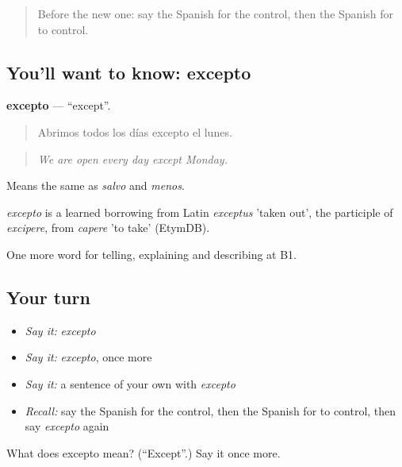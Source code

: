 \label{lesson:ES-C638-excepto}



\begin{quote}
Before the new one: say the Spanish for the control, then the Spanish for to control.
\end{quote}

\subsection*{You'll want to know: excepto}
\textbf{excepto} — \textquotedblleft{}except\textquotedblright{}.

\begin{quote}
Abrimos todos los días excepto el lunes.
\end{quote}

\begin{quote}
\emph{We are open every day except Monday.}
\end{quote}

Means the same as \emph{salvo} and \emph{menos}.

\begin{cousinweb}
\emph{excepto} is a learned borrowing from Latin \emph{exceptus} 'taken out', the participle of \emph{excipere}, from \emph{capere} 'to take' (EtymDB).
\end{cousinweb}

\begin{grammarlens}[title={What you've built}]
One more word for telling, explaining and describing at B1.
\end{grammarlens}

\subsection*{Your turn}
\begin{itemize}
\raggedright
  \item \emph{Say it:} \emph{excepto}
  \item \emph{Say it:} \emph{excepto}, once more
  \item \emph{Say it:} a sentence of your own with \emph{excepto}
  \item \emph{Recall:} say the Spanish for the control, then the Spanish for to control, then say \emph{excepto} again
\end{itemize}

\begin{tcolorbox}[breakable,colback=teal!4,colframe=teal!35!black,title={Before you move on}]
What does excepto mean? (\textquotedblleft{}Except\textquotedblright{}.) Say it once more.
\end{tcolorbox}
